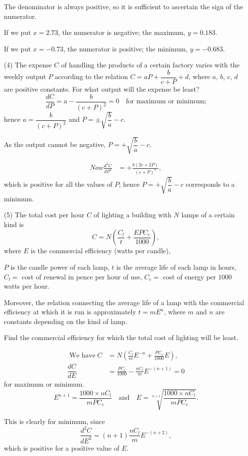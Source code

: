\documentclass{ximera}
\begin{document}
The denominator is always positive, so it is sufficient
to ascertain the sign of the numerator.

If we put $x = 2.73$, the numerator is negative; the
maximum, $y = 0.183$.

If we put $x=-0.73$, the numerator is positive; the
minimum, $y=-0.683$.

(4) The expense $C$ of handling the products of a
certain factory varies with the weekly output $P$
according to the relation $C = aP + \dfrac{b}{c+P} + d$, where
$a$, $b$, $c$, $d$ are positive constants. For what output
will the expense be least?
\[
\dfrac{dC}{dP} = a - \frac{b}{(c+P)^2} = 0\quad \text{for maximum or minimum;}
\]
hence $a = \dfrac{b}{(c+P)^2}$ and $P = \pm\sqrt{\dfrac{b}{a}} - c$.

As the output cannot be negative, $P=+\sqrt{\dfrac{b}{a}} - c$.

\begin{align*}
   Now
\frac{d^2C}{dP^2} &= + \frac{b(2c + 2P)}{(c + P)^4},
\end{align*}
which is positive for all the values of $P$; hence
$P = +\sqrt{\dfrac{b}{a}} - c$ corresponds to a minimum.

(5) The total cost per hour $C$ of lighting a building
with $N$ lamps of a certain kind is
\[
C = N\left(\frac{C_l}{t} + \frac{EPC_e}{1000}\right),
\]
where $E$ is the commercial efficiency (watts per candle),

$P$ is the candle power of each lamp,
$t$ is the average life of each lamp in hours,
$C_l =$ cost of renewal in pence per hour of use,
$C_e =$ cost of energy per $1000$ watts per hour.


Moreover, the relation connecting the average life
of a lamp with the commercial efficiency at which it
is run is approximately $t = mE^n$, where $m$ and $n$ are
constants depending on the kind of lamp.

Find the commercial efficiency for which the total
cost of lighting will be least.

\begin{align*}
\text{   We have}\;
C &= N\left(\frac{C_l}{m} E^{-n} + \frac{PC_e}{1000} E\right), \\
\dfrac{dC}{dE}
  &= \frac{PC_e}{1000} - \frac{nC_l}{m} E^{-(n+1)} = 0
\end{align*}
for maximum or minimum.
\[
E^{n+1} = \frac{1000 \times nC_l}{mPC_e}\quad \text{and}\quad
E = \sqrt[n+1]{\frac{1000 \times nC_l}{mPC_e}}.
\]


This is clearly for minimum, since
\[
\frac{d^2C}{dE^2} = (n + 1) \frac{nC_l}{m} E^{-(n+2)},
\]
which is positive for a positive value of $E$.
\end{document}
